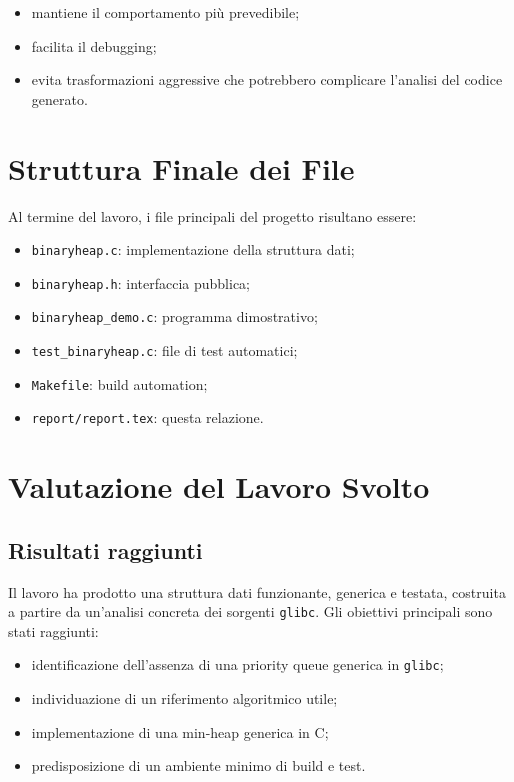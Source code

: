 \documentclass[a4paper,12pt]{article}
\begin{document}
\begin{itemize}[leftmargin=*]
    \item mantiene il comportamento più prevedibile;
    \item facilita il debugging;
    \item evita trasformazioni aggressive che potrebbero complicare l'analisi del codice generato.
\end{itemize}

\section{Struttura Finale dei File}

Al termine del lavoro, i file principali del progetto risultano essere:

\begin{itemize}[leftmargin=*]
    \item \texttt{binaryheap.c}: implementazione della struttura dati;
    \item \texttt{binaryheap.h}: interfaccia pubblica;
    \item \texttt{binaryheap\_demo.c}: programma dimostrativo;
    \item \texttt{test\_binaryheap.c}: file di test automatici;
    \item \texttt{Makefile}: build automation;
    \item \texttt{report/report.tex}: questa relazione.
\end{itemize}

\section{Valutazione del Lavoro Svolto}

\subsection{Risultati raggiunti}

Il lavoro ha prodotto una struttura dati funzionante, generica e testata, costruita a partire da un'analisi concreta dei sorgenti \texttt{glibc}. Gli obiettivi principali sono stati raggiunti:

\begin{itemize}[leftmargin=*]
    \item identificazione dell'assenza di una priority queue generica in \texttt{glibc};
    \item individuazione di un riferimento algoritmico utile;
    \item implementazione di una min-heap generica in C;
    \item predisposizione di un ambiente minimo di build e test.
\end{itemize}
\end{document}
